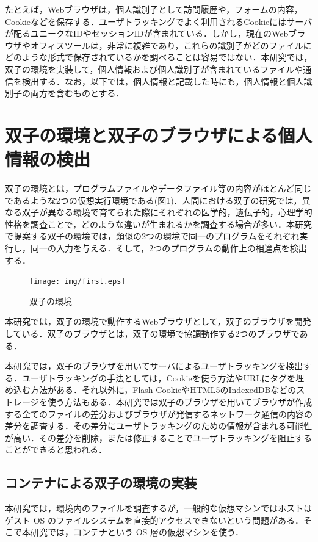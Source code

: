 \documentclass[submit,techrep]{ipsj}
\begin{document}
たとえば，Webブラウザは，個人識別子として訪問履歴や，フォームの内容，Cookieなどを保存する．ユーザトラッキングでよく利用されるCookieにはサーバが配るユニークなIDやセッションIDが含まれている．しかし，現在のWebブラウザやオフィスツールは，非常に複雑であり，これらの識別子がどのファイルにどのような形式で保存されているかを調べることは容易ではない．本研究では，双子の環境を実装して，個人情報および個人識別子が含まれているファイルや通信を検出する．なお，以下では，個人情報と記載した時にも，個人情報と個人識別子の両方を含むものとする．


\section{双子の環境と双子のブラウザによる個人情報の検出}
\label{twinsBrowser}
双子の環境とは，プログラムファイルやデータファイル等の内容がほとんど同じであるような2つの仮想実行環境である(図1)．人間における双子の研究では，異なる双子が異なる環境で育てられた際にそれぞれの医学的，遺伝子的，心理学的性格を調査ことで，どのような違いが生まれるかを調査する場合が多い．本研究で提案する双子の環境では，類似の2つの環境で同一のプログラムをそれぞれ実行し，同一の入力を与える．そして，2つのプログラムの動作上の相違点を検出する．

\begin{figure}[t]
\begin{center}
\texttt{[image: img/first.eps]}
\caption{双子の環境}
\label{figure:twin}
\end{center}
\end{figure}



本研究では，双子の環境で動作するWebブラウザとして，双子のブラウザを開発している\cite{comsys}．双子のブラウザとは，双子の環境で協調動作する2つのブラウザである．

本研究では，双子のブラウザを用いてサーバによるユーザトラッキングを検出する．ユーザトラッキングの手法としては，Cookieを使う方法やURLにタグを埋め込む方法がある．それ以外に，Flash CookieやHTML5のIndexedDBなどのストレージを使う方法もある．本研究では双子のブラウザを用いてブラウザが作成する全てのファイルの差分およびブラウザが発信するネットワーク通信の内容の差分を調査する．その差分にユーザトラッキングのための情報が含まれる可能性が高い．その差分を削除，または修正することでユーザトラッキングを阻止することができると思われる．




\subsection{コンテナによる双子の環境の実装}
本研究では，環境内のファイルを調査するが，一般的な仮想マシンではホストはゲスト OS のファイルシステムを直接的アクセスできないという問題がある．そこで本研究では，コンテナという OS 層の仮想マシンを使う．
\end{document}
